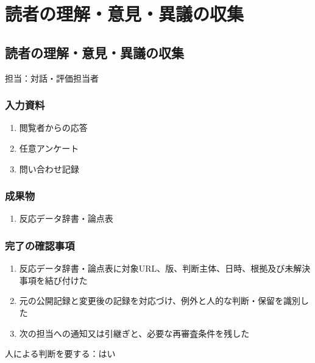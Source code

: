 \documentclass[a4paper,11pt]{article}
\begin{document}
\section{読者の理解・意見・異議の収集}
\subsection{読者の理解・意見・異議の収集}
\par 担当：対話・評価担当者\par\medskip
\subsubsection*{入力資料}
\begin{enumerate}[leftmargin=2em,itemsep=0.35em]
\item 閲覧者からの応答
\item 任意アンケート
\item 問い合わせ記録
\end{enumerate}
\subsubsection*{成果物}
\begin{enumerate}[leftmargin=2em,itemsep=0.35em]
\item 反応データ辞書・論点表
\end{enumerate}
\subsubsection*{完了の確認事項}
\begin{enumerate}[leftmargin=2em,itemsep=0.35em]
\item 反応データ辞書・論点表に対象URL、版、判断主体、日時、根拠及び未解決事項を結び付けた
\item 元の公開記録と変更後の記録を対応づけ、例外と人的な判断・保留を識別した
\item 次の担当への通知又は引継ぎと、必要な再審査条件を残した
\end{enumerate}
\par 人による判断を要する：はい\par\medskip
\end{document}
